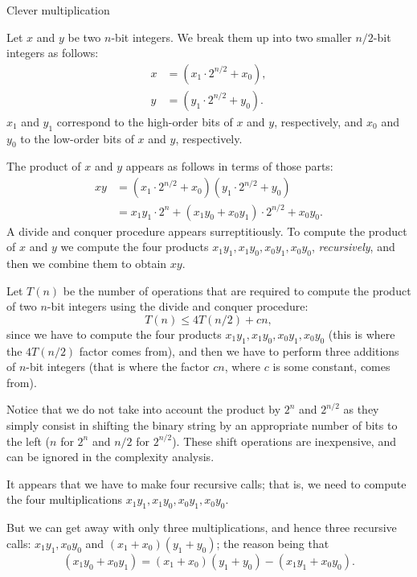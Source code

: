 \begin{frame}
{Clever multiplication}

Let $x$ and $y$ be two $n$-bit integers.  We break them up into two
smaller $n/2$-bit integers as follows:
\begin{align*}
x &= (x_1\cdot 2^{n/2}+x_0), \\
y &= (y_1\cdot 2^{n/2}+y_0).
\end{align*}
$x_1$ and $y_1$ correspond to the high-order bits of $x$ and $y$,
respectively, and $x_0$ and $y_0$ to the low-order bits of $x$ and
$y$, respectively.  
\end{frame}

\begin{frame}
The product of $x$ and $y$ appears as follows in
terms of those parts:
\begin{align}
xy &= (x_1\cdot 2^{n/2}+x_0)(y_1\cdot 2^{n/2}+y_0) \tag*{} \\
   &= x_1y_1\cdot 2^n+(x_1y_0+x_0y_1)\cdot 2^{n/2}+x_0y_0\label{eq:recmult}.
\end{align}
A divide and conquer procedure appears surreptitiously.  To compute
the product of $x$ and $y$ we compute the four products
$x_1y_1,x_1y_0,x_0y_1,x_0y_0$, {\em recursively}, and then we combine
them to obtain $xy$.
\end{frame}

\begin{frame}
Let $T(n)$ be the number of operations that are required to compute the
product of two $n$-bit integers using the divide and conquer
procedure:
\begin{equation}\label{eq:rec}
T(n)\le 4T(n/2)+cn,
\end{equation}
since we have to compute the four products
$x_1y_1,x_1y_0,x_0y_1,x_0y_0$ (this is where the $4T(n/2)$ factor
comes from), and then we have to perform three additions of $n$-bit
integers (that is where the factor $cn$, where $c$ is some constant,
comes from).  

Notice that we do not take into account the product by
$2^n$ and $2^{n/2}$ as they simply consist in
shifting the binary string by an appropriate number of bits to the
left ($n$ for $2^n$ and $n/2$ for $2^{n/2}$).  These shift operations
are inexpensive, and can be ignored in the complexity analysis.
\end{frame}

\begin{frame}
It appears that we have to make four recursive
calls; that is, we need to compute the four multiplications
$x_1y_1,x_1y_0,x_0y_1,x_0y_0$.  

But we can get away with only
three multiplications, and hence three recursive calls: $x_1y_1,x_0y_0$
and $(x_1+x_0)(y_1+y_0)$; the reason being that
\begin{equation}\label{eq:recmult2}
(x_1y_0+x_0y_1)=(x_1+x_0)(y_1+y_0)-(x_1y_1+x_0y_0).
\end{equation}
\end{frame}

